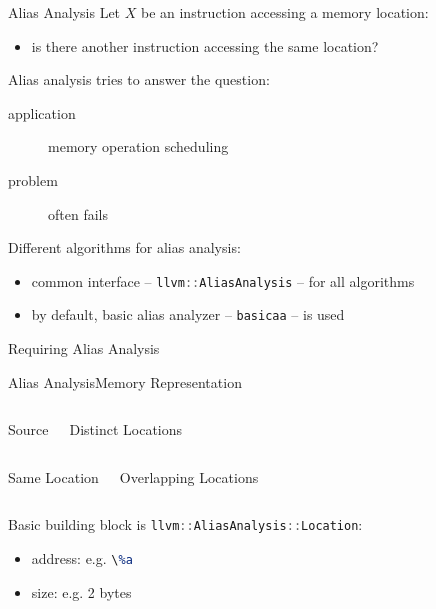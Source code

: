 \documentclass[10pt,mathserif]{beamer}
\newcommand{\cppinput}[1]{}
\newcommand{\cppinline}[1]{\lstinline[language=C++]!#1!}
\newcommand{\llvminput}[1]{}
\newcommand{\llvminline}[1]{\lstinline[language=LLVM]!#1!}
\begin{document}
\begin{frame}{Alias Analysis}
Let $X$ be an instruction accessing a memory location:

\begin{itemize}
\item is there another instruction accessing the same location?
\end{itemize}

Alias analysis tries to answer the question:

\begin{description}
\item[application] memory operation scheduling
\item[problem] often fails
\end{description}

Different algorithms for alias analysis:

\begin{itemize}
\item common interface -- \cppinline{llvm::AliasAnalysis} -- for all algorithms
\item by default, basic alias analyzer -- \texttt{basicaa} -- is used
\end{itemize}

\begin{block}{Requiring Alias Analysis}
\centering
\cppinput{snippet/02/requiring-alias-analysis.cpp}
\end{block}
\end{frame}

\begin{frame}{Alias Analysis}{Memory Representation}
\begin{columns}[t]
\begin{block}{Source}
\centering
\llvminput{snippet/02/memory-locations.ll}
\end{block}

\begin{block}{Distinct Locations}
\centering

\end{block}
\end{columns}

\begin{columns}[t]
\begin{block}{Same Location}
\centering

\end{block}

\begin{block}{Overlapping Locations}
\centering

\end{block}
\end{columns}

\bigskip
Basic building block is \cppinline{llvm::AliasAnalysis::Location}:

\begin{itemize}
\item address: e.g. \llvminline{\%a}
\item size: e.g. 2 bytes
\end{itemize}
\end{frame}
\end{document}
